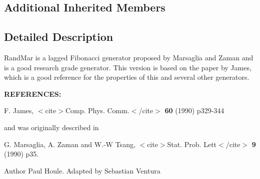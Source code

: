 \subsection*{Additional Inherited Members}


\subsection{Detailed Description}
Rand\-Mar is a lagged Fibonacci generator proposed by Marsaglia and Zaman and is a good research grade generator. This version is based on the paper by James, which is a good reference for the properties of this and several other generators.

{\bfseries R\-E\-F\-E\-R\-E\-N\-C\-E\-S\-: }

F. James, $<$cite$>$Comp. Phys. Comm.$<$/cite$>$ {\bfseries 60} (1990) p329-\/344 

and was originally described in

G. Marsaglia, A. Zaman and W.-\/\-W Tsang, $<$cite$>$Stat. Prob. Lett$<$/cite$>$ {\bfseries 9} (1990) p35. 

\begin{DoxyAuthor}{Author}
Paul Houle. Adapted by Sebastian Ventura 
\end{DoxyAuthor}


